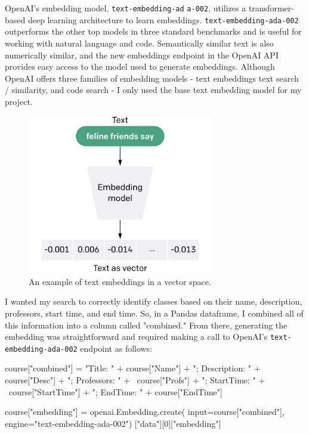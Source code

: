 \documentclass[
	a4paper, %
	10pt, %
	unnumberedsections, %
	twoside, %
]{LTJournalArticle}
\begin{document}
OpenAI's embedding model, \texttt{text-embedding-ad} 
\texttt{a-002}, utilizes a transformer-based deep learning architecture to learn  embeddings. \texttt{text-embedding-ada-002} outperforms the other top models in three standard benchmarks and is useful for working with natural language and code. Semantically similar text is also numerically similar, and the new embeddings endpoint in the OpenAI API provides easy access to the model used to generate embeddings. Although OpenAI offers three families of embedding models - text embeddings text search / similarity, and code search - I only used the base text embedding model for my project.


\begin{figure}[h]
    \includegraphics[width=8.1cm]{embedding.png}
    \caption{An example of text embeddings in a vector space.}
    \label{fig:embedding}
\end{figure}


I wanted my search to correctly identify classes based on their name, description, professors, start time, and end time. So, in a Pandas dataframe, I combined all of this information into a column called "combined." From there, generating the embedding was straightforward and required making a call to OpenAI's \texttt{text-embedding-ada-002} endpoint as follows: 

\begin{python}
	course["combined"] = "Title: " + 
	course["Name"] + "; Description: " + 
	course["Desc"] + "; Professors: " + \
	course["Profs"] + "; StartTime: " + \
	course["StartTime"] + "; EndTime: " + 
	course["EndTime"]

	course["embedding"] = 
	openai.Embedding.create(
	input=course["combined"], 
	engine="text-embedding-ada-002")
	["data"][0]["embedding"]
\end{python}
\end{document}
